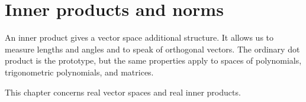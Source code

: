 \chapter{Inner products and norms}
\label{ch:linear-algebra-i:inner-products-and-norms}

An inner product gives a vector space additional structure. It allows us
to measure lengths and angles and to speak of orthogonal vectors. The
ordinary dot product is the prototype, but the same properties apply to
spaces of polynomials, trigonometric polynomials, and matrices.

This chapter concerns real vector spaces and real inner products.






